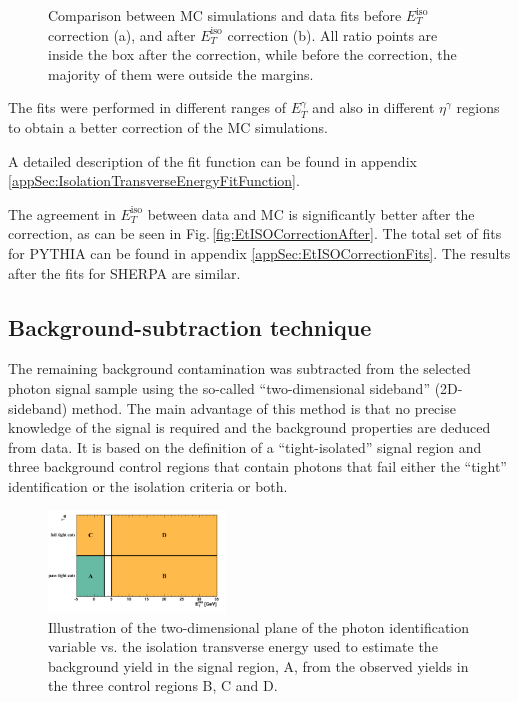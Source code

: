 \documentclass[12pt, twoside]{article}
\numberwithin{equation}{section}
\numberwithin{figure}{section}
\begin{document}
\begin{figure}[h]
    \vspace{0.5cm}
    \captionsetup{width=0.9\textwidth}
    \caption{Comparison between MC simulations and data fits before $E^{\text{iso}}_{T}$ correction (a), and after $E^{\text{iso}}_{T}$ correction (b). All ratio points are inside the box after the correction, while before the correction, the majority of them were outside the margins.}
    \label{fig:EtISOCorrection}
\end{figure}

The fits were performed in different ranges of $E^{\gamma}_{T}$ and also in different $\eta^{\gamma}$ regions to obtain a better correction of the MC simulations.

A detailed description of the fit function can be found in appendix \ref{appSec:IsolationTransverseEnergyFitFunction}.

The agreement in $E^{\text{iso}}_{T}$ between data and MC is significantly better after the correction, as can be seen in Fig.\,\ref{fig:EtISOCorrectionAfter}. The total set of fits for PYTHIA can be found in appendix \ref{appSec:EtISOCorrectionFits}. The results after the fits for SHERPA are similar.

\subsection{Background-subtraction technique}
\label{subsec:BackgroundSubtractionTechnique}

The remaining background contamination was subtracted from the selected photon signal sample using the so-called ``two-dimensional sideband'' (2D-sideband) method. The main advantage of this method is that no precise knowledge of the signal is required and the background properties are deduced from data. It is based on the definition of a ``tight-isolated'' signal region and three background control regions that contain photons that fail either the ``tight'' identification or the isolation criteria or both.

\begin{figure}
    \begin{center}
        \includegraphics[width=0.42\textwidth]{./images/planesubs.pdf}
        \captionsetup{width=0.42\textwidth}
        \caption{Illustration of the two-dimensional plane of the photon identification variable vs. the isolation transverse energy used to estimate the background yield in the signal region, A, from the observed yields in the three control regions B, C and D.}
        \vspace{-3.0cm}
    \end{center}
\end{figure}
\end{document}
